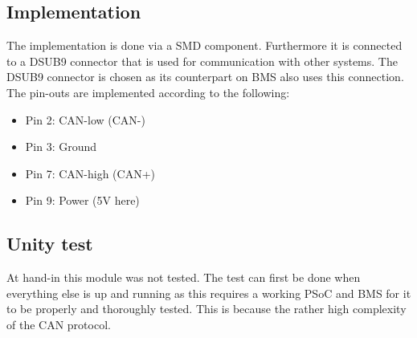 \subsection{Implementation}
The implementation is done via a SMD component. Furthermore it is connected to a DSUB9 connector that is used for communication with other systems. The DSUB9 connector is chosen as its counterpart on BMS also uses this connection. The pin-outs are implemented according to the following:

	\begin{itemize}
		\item Pin 2: CAN-low (CAN-)
		\item Pin 3: Ground
		\item Pin 7: CAN-high (CAN+)
		\item Pin 9: Power (5V here)
	\end{itemize} \cite{CAN-Connection}

\subsection{Unity test}
At hand-in this module was not tested. The test can first be done when everything else is up and running as this requires a working PSoC and BMS for it to be properly and thoroughly tested. This is because the rather high complexity of the CAN protocol. 